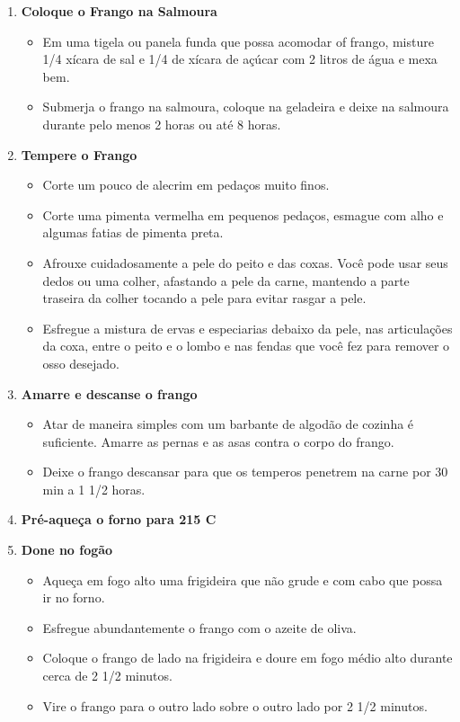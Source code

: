 \documentclass [11pt, letterpaper] {article}
\begin{document}
\begin {description}
\begin {enumerate}
\item {\bf Coloque o Frango na Salmoura}
\begin {itemize}
\item Em uma tigela ou panela funda que possa acomodar of frango, misture 1/4 xícara de sal e 1/4 de xícara de açúcar com 2 litros de água e mexa bem.
\item Submerja o frango na salmoura, coloque na geladeira e deixe na salmoura durante pelo menos 2 horas ou até 8 horas.
\end {itemize}

\item {\bf Tempere o Frango}
\begin {itemize}
\item Corte um pouco de alecrim em pedaços muito finos.
\item Corte uma pimenta vermelha em pequenos pedaços, esmague com alho e algumas fatias de pimenta preta.
\item Afrouxe cuidadosamente a pele do peito e das coxas. Você pode usar seus dedos ou uma colher, afastando a pele da carne, mantendo a parte traseira da colher tocando a pele para evitar rasgar a pele.
\item Esfregue a mistura de ervas e especiarias debaixo da pele, nas articulações da coxa, entre o peito e o lombo e nas fendas que você fez para remover o osso desejado.
\end {itemize}

\item {\bf Amarre e descanse o frango}
\begin {itemize}
\item Atar de maneira simples com um barbante de algod\~ao de cozinha  é suficiente. Amarre as pernas e as asas contra o corpo do frango.
\item Deixe o frango descansar para que os temperos penetrem na carne por 30 min a 1 1/2 horas.
\end {itemize}

\item {\bf Pré-aqueça o forno para 215 C}

\item {\bf Done no fog\~ao}
\begin {itemize}
\item Aqueça em fogo alto uma frigideira que n\~ao grude e com cabo que possa ir no forno.
\item Esfregue abundantemente o frango com o azeite de oliva.
\item Coloque o frango de lado na frigideira e doure em fogo médio alto durante cerca de 2 1/2 minutos.
\item Vire o frango para o outro lado sobre o outro lado por 2 1/2 minutos.
\end {itemize}


\end{enumerate}
\end{description}
\end{document}

